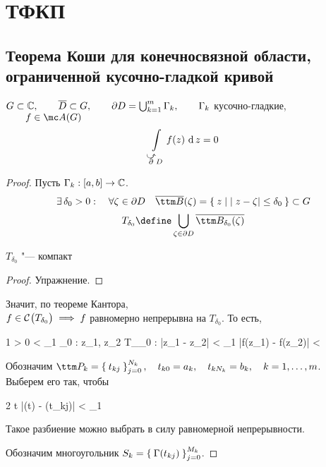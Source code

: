 \chapter{ТФКП}

\section{Теорема Коши для конечносвязной области, ограниченной кусочно-гладкой кривой}

\begin{theorem}
	$ G \sub \Co, \qquad \ol D \sub G, \qquad \partial D = \bigcup_{k = 1}^m \Gamma_k, \qquad \Gamma_k $ кусочно-гладкие, $ \qquad f \in \mc A(G) $
	$$ \cint[z]{\curvedir\partial D}{f(z)} = 0 $$
\end{theorem}

\begin{proof}
	Пусть $ \Gamma_k : [a, b] \to \Co $.
	$$ \exist \delta_0 > 0 : \quad \forall \zeta \in \partial D \quad \ol{\ttm B}(\zeta) = \set{ z \mid |z - \zeta| \le \delta_0} \sub G $$
	$$ T_{\delta_0} \define \bigcup_{\zeta \in \partial D} \ol{\ttm B_{\delta_0}(\zeta)} $$
	\begin{statement}
		$ T_{\delta_0} $ "--- компакт
	\end{statement}
	\begin{proof}
		Упражнение.
	\end{proof}
	Значит, по теореме Кантора, \\
	$ f \in \Cont{T_{\delta_0}} \implies f $ равномерно непрерывна на $ T_{\delta_0} $. То есть,
	\begin{equ}1
		\forall \veps > 0 \quad {} < \delta_1 \le \delta_0 : \quad \forall z_1, z_2 \in T_{\delta_0} : |z_1 - z_2| < \delta_1 \quad |f(z_1) - f(z_2)| < \veps
	\end{equ}
	Обозначим $ \ttm P_k = \seqz[N_k]{t_{kj}}j, \quad t_{k0} = a_k, \quad t_{kN_k} = b_k, \quad k = 1, \dots, m $. \\
	Выберем его так, чтобы
	\begin{equ}2
		\forall t \in [t_{kj}, t_{k~j + 1}] \quad |\Gamma(t) - \Gamma(t_{kj})| < \delta_1
	\end{equ}
	Такое разбиение можно выбрать в силу равномерной непрерывности.

	Обозначим многоугольник $ S_k = \seqz[M_k]{\Gamma(t_{kj})}j $.


\end{proof}

